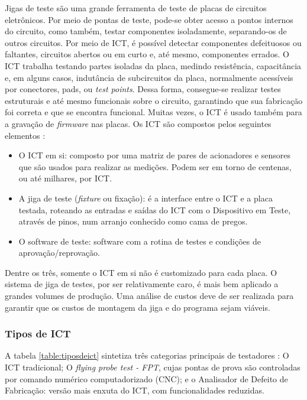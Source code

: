 Jigas de teste são uma grande ferramenta de teste de placas de circuitos eletrônicos. Por meio de pontas de teste, pode-se obter acesso a pontos internos do circuito, como também, testar componentes isoladamente, separando-os de outros circuitos. Por meio de ICT, é possível detectar componentes defeituosos ou faltantes, circuitos abertos ou em curto e, até mesmo, componentes errados. O ICT trabalha testando partes isoladas da placa, medindo resistência, capacitância e, em alguns casos, indutância de subcircuitos da placa, normalmente acessíveis por conectores, pads, ou \textit{test points}. Dessa forma, consegue-se realizar testes estruturais e até mesmo funcionais sobre o circuito, garantindo que sua fabricação foi correta e que se encontra funcional. Muitas vezes, o ICT é usado também para a gravação de \textit{firmware} nas placas. Os ICT são compostos pelos seguintes elementos \citep{ianpoole2017}:

\begin{itemize}
    \item O ICT em si: composto por uma matriz de pares de acionadores e sensores que são usados para realizar as medições. Podem ser em torno de centenas, ou até milhares, por ICT.
    \item A jiga de teste (\textit{fixture} ou fixação):  é a interface entre o ICT e a placa testada, roteando as entradas e saídas do ICT com o Dispositivo em Teste, através de pinos, num arranjo conhecido como cama de pregos.
    \item O software de teste: software com a rotina de testes e condições de aprovação/reprovação.
\end{itemize}

Dentre os três, somente o ICT em si não é customizado para cada placa. O sistema de jiga de testes, por ser relativamente caro, é mais bem aplicado a grandes volumes de produção. Uma análise de custos deve de ser realizada para garantir que os custos de montagem da jiga e do programa sejam viáveis. 

\subsubsection{Tipos de ICT}

A tabela \ref{table:tiposdeict} sintetiza três categorias principais de testadores \citep{ianpoole2017}: O ICT tradicional; O \textit{flying probe test - FPT}, cujas pontas de prova são controladas por comando numérico computadorizado (CNC); e o Analisador de Defeito de Fabricação: versão mais enxuta do ICT, com funcionalidades reduzidas. 

